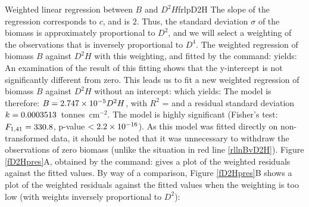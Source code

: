 \begin{filrouge}{Weighted linear regression between $B$ and $D^2H$}{frlpD2H}
The slope of the regression corresponds to $c$,  and is $2$. Thus, the standard deviation $\sigma$  of the biomass is approximately proportional to $D^2$, and we will select a weighting of the observations that is inversely proportional to $D^4$.
The weighted regression of biomass $B$ against $D^2H$ with this weighting, and fitted by the command:
%
yields:
%
An examination of the result of this fitting shows that the y-intercept is not significantly different from zero. This leads us to fit a new weighted regression of biomass $B$ against $D^2H$ without an intercept:
%
which yields:
%
The model is therefore: $B=\mbox{2.747}\times10^{-5}D^2H$, with $R^2$ =  and a residual standard deviation $k=\mbox{0.0003513}$~tonnes~cm$^{-2}$. The model is highly significant (Fisher's test: $F_{1,41}=\mbox{330.8}$, p-value $<\mbox{2.2}\times10^{-16}$). As this model was fitted directly on non-transformed data, it should be noted that it was unnecessary to withdraw the observations of zero biomass (unlike the situation in red line \ref{rllnBvD2H}).  Figure \ref{fD2Hpres}A, obtained by the command:
%
gives a plot of the weighted residuals against the fitted values. By way of a comparison,  Figure \ref{fD2Hpres}B shows a plot of the weighted residuals against the fitted values when the weighting is too low (with weights inversely proportional to $D^2$):

\end{filrouge}
